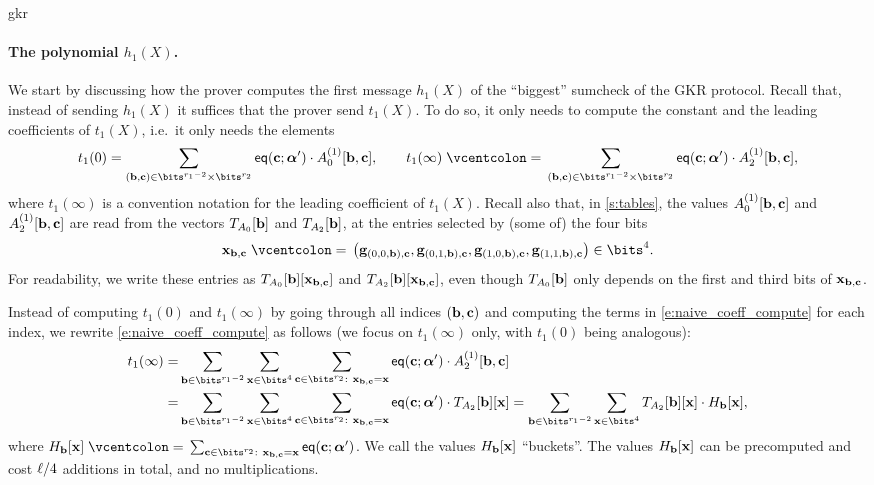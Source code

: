 \begin{lncsappendix}{gkr}
\paragraph{The polynomial $h_1(X)$.} We start by discussing how the prover computes the first message $h_1(X)$ of the ``biggest'' sumcheck of the GKR protocol. Recall that, instead of sending $h_1(X)$ it suffices  that the prover send $t_1(X)$. To do so,  it only needs to compute the constant and the leading coefficients of $t_1(X)$, i.e.\ it only needs the elements \begin{equation}\label{e:naive_coeff_compute}t_1(0)=\sum_{(\bb,\cc)\in \bits^{r_1-2}\times \bits^{r_2}}\eq(\cc;\bm{\alpha}')\cdot A_0^{(1)}[\bb,\cc],\qquad t_1(\infty)\defeq\sum_{(\bb,\cc)\in \bits^{r_1-2}\times \bits^{r_2}}\eq(\cc;\bm{\alpha}')\cdot  A_2^{(1)}[\bb,\cc],\end{equation} where $t_1(\infty)$ is a convention notation for the leading coefficient of $t_1(X)$.  Recall also that, in \cref{s:tables}, the values $A_0^{(1)}[\mathbf{b},\mathbf{c}]$ and $A_2^{(1)}[\mathbf{b},\mathbf{c}]$ are read from the vectors $T_{A_0}[\mathbf{b}]$ and $T_{A_2}[\mathbf{b}]$, at the entries selected by (some of) the four bits
%
$$
\xx_{\bb,\cc}\defeq \left(\bfg_{(0,0,\bb),\cc},\bfg_{(0,1,\bb),\cc},\bfg_{(1,0,\bb),\cc},\bfg_{(1,1,\bb),\cc}\right)\in \bits^4.
$$
%
\noindent For readability, we write these entries as $T_{A_0}[\mathbf{b}][\mathbf{x}_{\mathbf{b},\mathbf{c}}]$ and $T_{A_2}[\mathbf{b}][\mathbf{x}_{\mathbf{b},\mathbf{c}}]$, even though $T_{A_0}[\mathbf{b}]$ only depends on the first and third bits of $\mathbf{x}_{\mathbf{b},\mathbf{c}}$.

Instead of computing $t_1(0)$ and $t_1(\infty)$ by going through all indices $(\mathbf{b},\mathbf{c})$ and computing the terms in  \eqref{e:naive_coeff_compute} for each index, we rewrite \eqref{e:naive_coeff_compute} as follows (we focus on $t_1(\infty)$ only, with $t_1(0)$ being analogous):
%
\begin{align*}
t_1(\infty)=& \sum_{\bb\in \bits^{r_1-2}} \sum_{\xx\in \bits^4} \sum_{\cc\in\bits^{r_2} : \ \xx_{\bb,\cc}=\xx} \eq(\cc;\bm{\alpha}')\cdot A_2^{(1)}[\bb,\cc]\\ =&  \sum_{\bb\in \bits^{r_1-2}} \sum_{\xx\in \bits^4} \sum_{\cc\in\bits^{r_2} : \ \xx_{\bb,\cc}=\xx} \eq(\cc;\bm{\alpha}')\cdot T_{A_2}[\bb][\xx]  = \sum_{\bb\in \bits^{r_1-2}} \sum_{\xx\in \bits^4}  T_{A_2}[\bb][\xx] \cdot H_{\bb}[\xx],
\end{align*}
where $H_{\bb}[\xx]\defeq \sum_{\cc\in\bits^{r_2} : \ \xx_{\bb,\cc}=\xx} \eq(\cc;\bm{\alpha}')$. We call the values $H_{\mathbf{b}}[\mathbf{x}]$ ``buckets''.
The values $H_{\mathbf{b}}[\mathbf{x}]$ can be precomputed and cost $\ell/4$ additions in total, and no multiplications. 


\end{lncsappendix}
